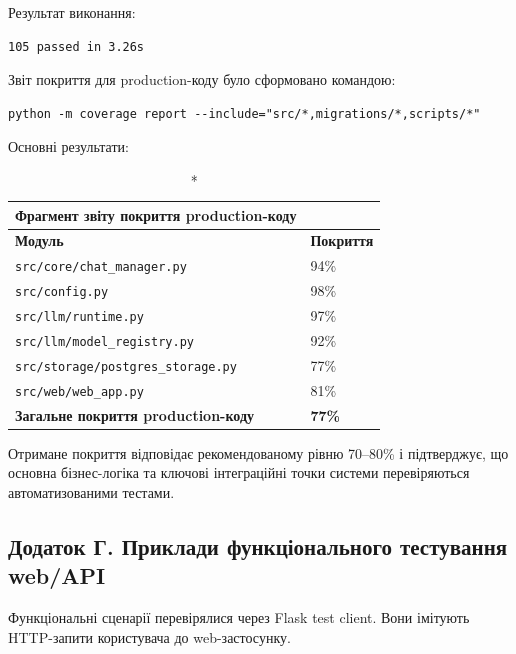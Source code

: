 Результат виконання:

\begin{lstlisting}[style=plantumlstyle]
105 passed in 3.26s
\end{lstlisting}

Звіт покриття для production-коду було сформовано командою:

\begin{lstlisting}[style=plantumlstyle]
python -m coverage report --include="src/*,migrations/*,scripts/*"
\end{lstlisting}

Основні результати:

\begin{longtable}{|p{8cm}|p{3cm}|}
\caption*{Фрагмент звіту покриття production-коду}\\
\hline
\textbf{Модуль} & \textbf{Покриття} \\
\hline
\texttt{src/core/chat\_manager.py} & 94\% \\
\hline
\texttt{src/config.py} & 98\% \\
\hline
\texttt{src/llm/runtime.py} & 97\% \\
\hline
\texttt{src/llm/model\_registry.py} & 92\% \\
\hline
\texttt{src/storage/postgres\_storage.py} & 77\% \\
\hline
\texttt{src/web/web\_app.py} & 81\% \\
\hline
\textbf{Загальне покриття production-коду} & \textbf{77\%} \\
\hline
\end{longtable}

Отримане покриття відповідає рекомендованому рівню 70--80\% і підтверджує, що основна бізнес-логіка та ключові інтеграційні точки системи перевіряються автоматизованими тестами.

\subsection*{Додаток Г. Приклади функціонального тестування web/API}

Функціональні сценарії перевірялися через Flask test client. Вони імітують HTTP-запити користувача до web-застосунку.

